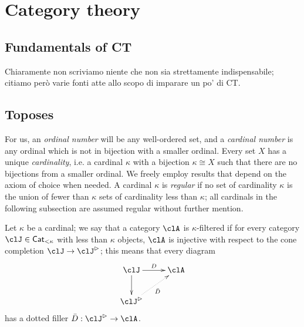 \section{Category theory}
\subsection{Fundamentals of CT}
Chiaramente non scriviamo niente che non sia strettamente indispensabile; citiamo però varie fonti atte allo scopo di imparare un po' di CT.
\subsection{Toposes}\leavevmode
{}
For us, an \emph{ordinal number} will be any well\hyp{}ordered set, and a \emph{cardinal number} is any ordinal which is not in bijection with a smaller ordinal. Every set $X$ has a unique \emph{cardinality}, i.e. a cardinal $\kappa$ with a bijection $\kappa \cong X$ such that there are no bijections from a smaller ordinal. We freely employ results that depend on the axiom of choice when needed. A cardinal $\kappa$ is \emph{regular} if no set of cardinality $\kappa$ is the union of fewer than $\kappa$ sets of cardinality less than $\kappa$; all cardinals in the following subsection are assumed regular without further mention.

Let $\kappa$ be a cardinal; we say that a category $\clA$ is $\kappa$\hyp{}filtered if for every category $\clJ\in\Cat_{<\kappa}$ with less than $\kappa$ objects, $\clA$ is injective with respect to the cone completion $\clJ\to \clJ^\rhd$; this means that every diagram
\[
  \vcenter{\xymatrix{
      \clJ\ar[d]\ar[r]^D & \clA \\
      \clJ^\rhd\ar@{.>}[ur]_{\bar D}
    }}
\]
has a dotted filler $\bar D : \clJ^\rhd \to \clA$.

